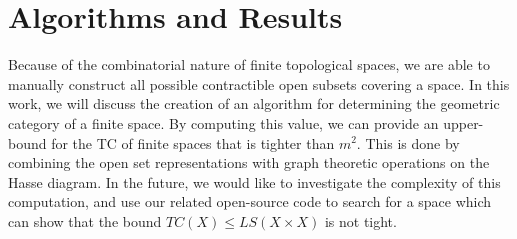\documentclass[11pt]{article}
\begin{document}
\section{Algorithms and Results}
Because of the combinatorial nature of finite topological spaces, we are able to manually construct all possible contractible open subsets covering a space.
In this work, we will discuss the creation of an algorithm for determining the geometric category of a finite space.
By computing this value, we can provide an upper-bound for the TC of finite spaces that is tighter than $m^2$.
This is done by combining the open set representations with graph theoretic operations on the Hasse diagram.
In the future, we would like to investigate the complexity of this computation, and use our related open-source code to search for a space which can show that the bound $TC(X) \leq LS(X \times X)$ is not tight.


{}

\end{document}
